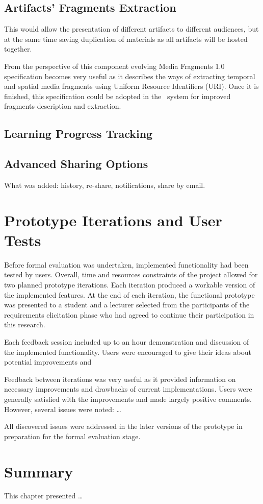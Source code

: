 \subsection{Artifacts' Fragments Extraction}
\label{sec:frag}

This would allow the presentation of different artifacts to different audiences,
but at the same time saving duplication of materials as all artifacts will be
hosted together. 

From the perspective of this component evolving Media Fragments 1.0
specification \citep{MediaGroup2011} becomes very useful as it describes the
ways of extracting temporal and spatial media fragments using Uniform Resource
Identifiers (URI). Once it is finished, this specification could be adopted in
the \ep~system for improved fragments description and extraction.

\subsection{Learning Progress Tracking}

\subsection{Advanced Sharing Options}

What was added: history, re-share, notifications, share by email.

\section{Prototype Iterations and User Tests}
 
Before formal evaluation was undertaken, implemented functionality had been
tested by users. Overall, time and resources constraints of the project allowed
for two planned prototype iterations. Each iteration produced a workable version
of the implemented features. At the end of each iteration, the functional
prototype was presented to a student and a lecturer selected from the
participants of the requirements elicitation phase who had agreed to continue
their participation in this research.

Each feedback session included up to an hour demonstration and discussion of the
implemented functionality. Users were encouraged to give their ideas about
potential improvements and 

Feedback between iterations was very useful as it provided information on
necessary improvements and drawbacks of current implementations. Users were
generally satisfied with the improvements and made largely positive comments.
However, several issues were noted: \ldots

All discovered issues were addressed in the later versions of the prototype
in preparation for the formal evaluation stage.

\section{Summary}

This chapter presented \ldots